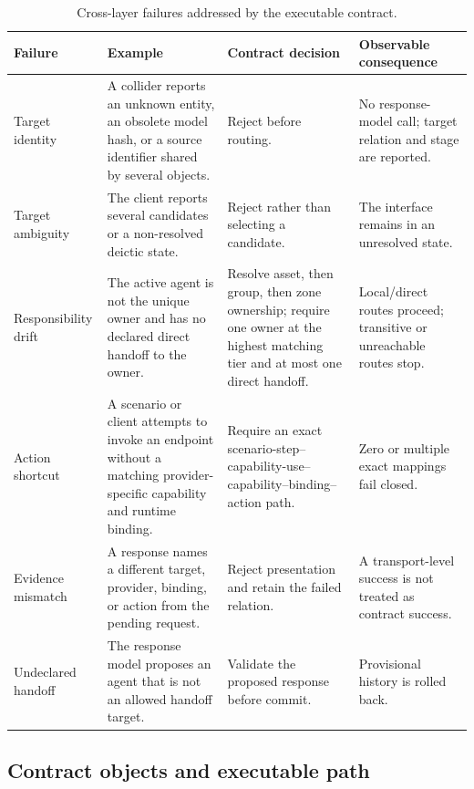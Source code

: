 \begin{table}[t]
  \caption{Cross-layer failures addressed by the executable contract.}
  \label{tab:failure-model}
  \small
  \begin{tabularx}{\textwidth}{@{}p{22mm}Y Y Y@{}}
    \toprule
    Failure & Example & Contract decision & Observable consequence \\
    \midrule
    Target identity
      & A collider reports an unknown entity, an obsolete model hash, or a
        source identifier shared by several objects.
      & Reject before routing.
      & No response-model call; target relation and stage are reported. \\
    Target ambiguity
      & The client reports several candidates or a non-resolved deictic state.
      & Reject rather than selecting a candidate.
      & The interface remains in an unresolved state. \\
    Responsibility drift
      & The active agent is not the unique owner and has no declared direct
        handoff to the owner.
      & Resolve asset, then group, then zone ownership; require one owner at the
        highest matching tier and at most one direct handoff.
      & Local/direct routes proceed; transitive or unreachable routes stop. \\
    Action shortcut
      & A scenario or client attempts to invoke an endpoint without a matching
        provider-specific capability and runtime binding.
      & Require an exact scenario-step--capability-use--capability--binding--action
        path.
      & Zero or multiple exact mappings fail closed. \\
    Evidence mismatch
      & A response names a different target, provider, binding, or action from
        the pending request.
      & Reject presentation and retain the failed relation.
      & A transport-level success is not treated as contract success. \\
    Undeclared handoff
      & The response model proposes an agent that is not an allowed handoff
        target.
      & Validate the proposed response before commit.
      & Provisional history is rolled back. \\
    \bottomrule
  \end{tabularx}
\end{table}

\subsection{Contract objects and executable path}

